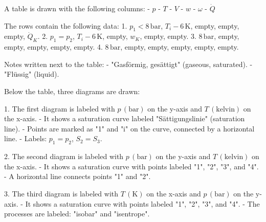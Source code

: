 A table is drawn with the following columns:  
- \( p \)  
- \( T \)  
- \( V \)  
- \( w \)  
- \( \omega \)  
- \( \dot{Q} \)  

The rows contain the following data:  
1. \( p_1 < 8 \, \text{bar} \), \( T_i - 6 \, \text{K} \), empty, empty, empty, \( \dot{Q}_K \).  
2. \( p_1 = p_2 \), \( T_i - 6 \, \text{K} \), empty, \( w_K \), empty, empty.  
3. \( 8 \, \text{bar} \), empty, empty, empty, empty, empty.  
4. \( 8 \, \text{bar} \), empty, empty, empty, empty, empty.  

Notes written next to the table:  
- "Gasförmig, gesättigt" (gaseous, saturated).  
- "Flüssig" (liquid).  

Below the table, three diagrams are drawn:  

1. The first diagram is labeled with \( p \, (\text{bar}) \) on the y-axis and \( T \, (\text{kelvin}) \) on the x-axis.  
   - It shows a saturation curve labeled "Sättigungslinie" (saturation line).  
   - Points are marked as "1" and "i" on the curve, connected by a horizontal line.  
   - Labels: \( p_1 = p_2 \), \( S_2 = S_3 \).  

2. The second diagram is labeled with \( p \, (\text{bar}) \) on the y-axis and \( T \, (\text{kelvin}) \) on the x-axis.  
   - It shows a saturation curve with points labeled "1", "2", "3", and "4".  
   - A horizontal line connects points "1" and "2".  

3. The third diagram is labeled with \( T \, (\text{K}) \) on the x-axis and \( p \, (\text{bar}) \) on the y-axis.  
   - It shows a saturation curve with points labeled "1", "2", "3", and "4".  
   - The processes are labeled: "isobar" and "isentrope".